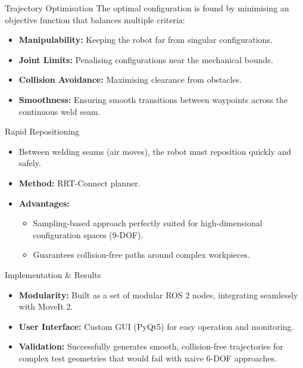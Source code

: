 \documentclass[10pt, aspectratio=169]{beamer}
\begin{document}
\begin{frame}{Trajectory Optimisation}
    The optimal configuration is found by minimising an objective function that balances multiple criteria:
    \begin{itemize}
        \item \textbf{Manipulability:} Keeping the robot far from singular configurations.
        \item \textbf{Joint Limits:} Penalising configurations near the mechanical bounds.
        \item \textbf{Collision Avoidance:} Maximising clearance from obstacles.
        \item \textbf{Smoothness:} Ensuring smooth transitions between waypoints across the continuous weld seam.
    \end{itemize}
\end{frame}

\begin{frame}{Rapid Repositioning}
    \begin{itemize}
        \item Between welding seams (air moves), the robot must reposition quickly and safely.
        \item \textbf{Method:} RRT-Connect planner.
        \item \textbf{Advantages:}
        \begin{itemize}
            \item Sampling-based approach perfectly suited for high-dimensional configuration spaces (9-DOF).
            \item Guarantees collision-free paths around complex workpieces.
        \end{itemize}
    \end{itemize}
\end{frame}

\begin{frame}{Implementation \& Results}
    \begin{itemize}
        \item \textbf{Modularity:} Built as a set of modular ROS 2 nodes, integrating seamlessly with MoveIt 2.
        \item \textbf{User Interface:} Custom GUI (PyQt5) for easy operation and monitoring.
        \item \textbf{Validation:} Successfully generates smooth, collision-free trajectories for complex test geometries that would fail with naive 6-DOF approaches.
    \end{itemize}
\end{frame}
\end{document}

